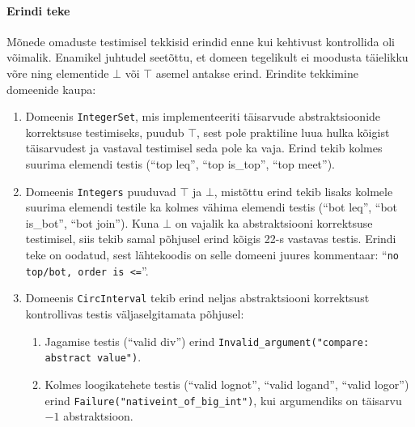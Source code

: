 \documentclass[../thesis.tex]{subfiles}
\begin{document}
\paragraph{Erindi teke}
Mõnede omaduste testimisel tekkisid erindid enne kui kehtivust kontrollida oli võimalik. Enamikel juhtudel seetõttu, et domeen tegelikult ei moodusta täielikku võre ning elementide $\bot$ või $\top$ asemel antakse erind. Erindite tekkimine domeenide kaupa:
\begin{enumerate}
	\item Domeenis \texttt{IntegerSet}, mis implementeeriti täisarvude abstraktsioonide korrektsuse testimiseks, puudub $\top$, sest pole praktiline luua hulka kõigist täisarvudest ja vastaval testimisel seda pole ka vaja. Erind tekib kolmes suurima elemendi testis (\enquote{top leq}, \enquote{top is\_top}, \enquote{top meet}).

	\item Domeenis \texttt{Integers} puuduvad $\top$ ja $\bot$, mistõttu erind tekib lisaks kolmele suurima elemendi testile ka kolmes vähima elemendi testis (\enquote{bot leq}, \enquote{bot is\_bot}, \enquote{bot join}). Kuna $\bot$ on vajalik ka abstraktsiooni korrektsuse testimisel, siis tekib samal põhjusel erind kõigis 22-s vastavas testis. Erindi teke on oodatud, sest lähtekoodis on selle domeeni juures kommentaar: \enquote{\texttt{no top/bot, order is <=}}.

	\item Domeenis \texttt{CircInterval} tekib erind neljas abstraktsiooni korrektsust kontrollivas testis väljaselgitamata põhjusel:
	\begin{enumerate}[nosep]
		\item Jagamise testis (\enquote{valid div}) erind \texttt{Invalid\_argument("compare: abstract value")}.

		\item Kolmes loogikatehete testis (\enquote{valid lognot}, \enquote{valid logand}, \enquote{valid logor}) erind \texttt{Failure("nativeint\_of\_big\_int")}, kui argumendiks on täisarvu $-1$ abstraktsioon.
	\end{enumerate}
\end{enumerate}
\end{document}
